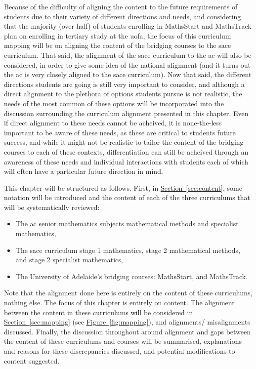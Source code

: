 \documentclass[twoside,12pt,a4paper]{report}
\newcommand{\refsec}[1]{\hyperref[sec:#1]{Section~\ref{sec:#1}}}
\newcommand{\reffig}[1]{\hyperref[fig:#1]{Figure~\ref{fig:#1}}}
\begin{document}
Because of the difficulty of aligning the content to the future requirements of students due to their variety of different directions and needs, and considering that the majority (over half) of students enrolling in MathsStart and MathsTrack plan on enrolling in tertiary study at the \gls{uofa}, the focus of this curriculum mapping will be on aligning the content of the bridging courses to the \gls{sace} curriculum. That said, the alignment of the \gls{sace} curriculum to the \gls{ac} will also be considered, in order to give some idea of the national alignment (and it turns out the \gls{ac} is very closely aligned to the \gls{sace} curriculum). Now that said, the different directions students are going is still very important to consider, and although a direct alignment to the plethora of options students pursue is not realistic, the needs of the most common of these options will be incorporated into the discussion surrounding the curriculum alignment presented in this chapter. Even if direct alignment to these needs cannot be acheived, it is none-the-less important to be aware of these needs, as these are critical to students future success, and while it might not be realistic to tailor the content of the bridging courses to each of these contexts, differentiation can still be acheived through an awareness of these needs and individual interactions with students each of which will often have a particular future direction in mind.

This chapter will be structured as follows. First, in \refsec{content}, some notation will be introduced and the content of each of the three curriculums that will be systematically reviewed:
\begin{itemize}
	\item The \gls{ac} senior mathematics subjects mathematical methods and specialist mathematics,
	\item The \gls{sace} curriculum stage 1 mathematics, stage 2 mathematical methods, and stage 2 specialist mathematics,
	\item The University of Adelaide's bridging courses: MathsStart, and MathsTrack.
\end{itemize}
Note that the alignment done here is entirely on the content of these curriculums, nothing else. The focus of this chapter is entirely on content. The alignment between the content in these curriculums will be considered in \refsec{mapping} (see \reffig{mapping}), and alignments/ misalignments discussed. Finally, the discussion throughout around alignment and gaps between the content of these curriculums and courses will be summarised, explanations and reasons for these discrepancies discussed, and potential modifications to content suggested. 
\end{document}
